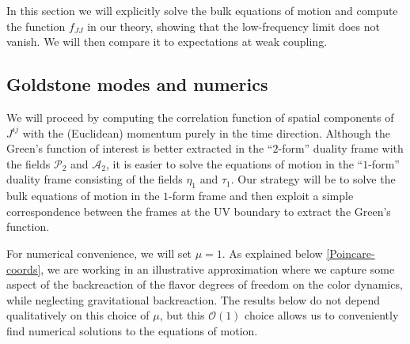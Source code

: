\documentclass[aps,preprint,nofootinbib,preprintnumbers,eqsecnum,superscriptaddress]{revtex4}
\begin{document}
In this section we will explicitly solve the bulk equations of motion and compute the function $f_{JJ}$ in our theory, showing that the low-frequency limit does not vanish. We will then compare it to expectations at weak coupling.  
\subsection{Goldstone modes and numerics}

We will proceed by computing the correlation function of spatial components of $J^{ij}$ with the (Euclidean) momentum purely in the time direction. Although the Green's function of interest is better extracted in the ``$2$-form'' duality frame with the fields $\mathcal{P}_2$ and $\mathcal{A}_2$, it is easier to solve the equations of motion in the ``$1$-form'' duality frame consisting of the fields $\eta_1$ and $\tau_1$. Our strategy will be to solve the bulk equations of motion in the $1$-form frame and then exploit a simple correspondence between the frames at the UV boundary to extract the Green's function. 

For numerical convenience, we will set $\mu = 1$. As explained below \eqref{Poincare-coords}, we are working in an illustrative approximation where we capture some aspect of the backreaction of the flavor degrees of freedom on the color dynamics, while neglecting gravitational backreaction. The results below do not depend qualitatively on this choice of $\mu$, but this $\mathcal{O}(1)$ choice allows us to conveniently find  numerical solutions to the equations of motion.
\end{document}
